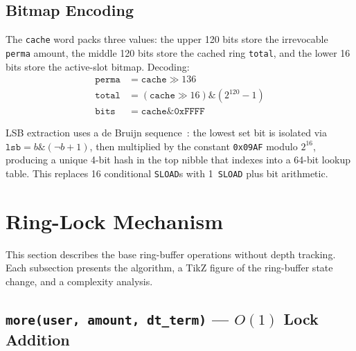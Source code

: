 \documentclass[10pt,a4paper,twocolumn]{article}
\begin{document}
\subsection{Bitmap Encoding}
\label{subsec:bitmap}

The \texttt{cache} word packs three values: the upper 120 bits store the irrevocable \texttt{perma} amount, the middle 120 bits store the cached ring \texttt{total}, and the lower 16 bits store the active-slot bitmap. Decoding:
\begin{align}
\texttt{perma} &= \texttt{cache} \gg 136 \label{eq:decode-perma} \\
\texttt{total} &= (\texttt{cache} \gg 16) \mathbin{\&} (2^{120}{-}1) \label{eq:decode-total} \\
\texttt{bits}  &= \texttt{cache} \mathbin{\&} \texttt{0xFFFF} \label{eq:decode-bits}
\end{align}

LSB extraction uses a de Bruijn sequence~\cite{debruijn}: the lowest set bit is isolated via $\texttt{lsb} = b \mathbin{\&} (\lnot b + 1)$, then multiplied by the constant \texttt{0x09AF} modulo $2^{16}$, producing a unique 4-bit hash in the top nibble that indexes into a 64-bit lookup table. This replaces 16 conditional \texttt{SLOAD}s with 1~\texttt{SLOAD} plus bit arithmetic.

\section{Ring-Lock Mechanism}
\label{sec:ringlock}

This section describes the base ring-buffer operations without depth tracking. Each subsection presents the algorithm, a TikZ figure of the ring-buffer state change, and a complexity analysis.

\subsection{\texttt{more(user, amount, dt\_term)} --- $O(1)$ Lock Addition}
\label{subsec:more}
\end{document}
